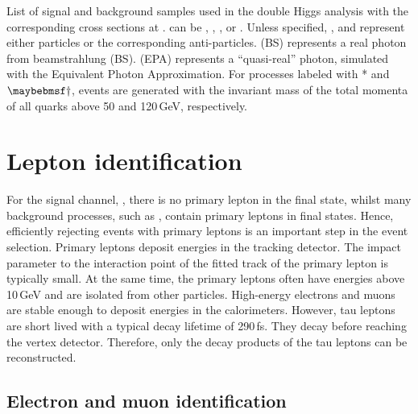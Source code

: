 \begin{table}[!htbp]
\caption[Signal and background samples with the corresponding cross sections at .]
{List of signal and background samples used in the double Higgs analysis with the corresponding cross sections at . \Pquark can be \Pup, \Pdown, \Pstrange, \Pbottom or \Ptop. Unless specified, \Pquark, \Plepton and \Pnu represent either particles or the corresponding anti-particles. \Pphoton(BS) represents a real photon from beamstrahlung (BS). \Pphoton(EPA) represents a ``quasi-real'' photon, simulated with the Equivalent Photon Approximation. For processes labeled with * and $\myDagger$, events are generated with the invariant mass of the total momenta of all quarks above 50 and 120\,GeV, respectively.}
\label{tab:doubleHiggsMCSamples}
\end{table}

\section{Lepton identification}
\label{sec:doubleHiggsLepton}

For the signal channel, \eeToHHbbWWHad, there is no primary lepton in the final state, whilst many background  processes, such as \HepProcess{\Pquark \Pquark \Pquark \Pquark \Plepton \Pnu}, contain primary leptons in final states. Hence, efficiently rejecting events with primary leptons is an important step in the event selection. Primary leptons deposit energies in the tracking detector. The impact parameter to the interaction point of the fitted track of the primary lepton is typically small. At the same time, the primary leptons often have energies above 10\,GeV and are  isolated from other particles. High-energy electrons and muons are stable enough to deposit energies in the calorimeters. However,  tau leptons are short lived with a typical decay lifetime of 290\,fs\cite{Abreu:1991jn}. They decay before reaching the vertex detector. Therefore, only the decay products of the tau leptons can be reconstructed.





\subsection{Electron and muon identification}
\label{sec:doubleHiggsLeptonID}

